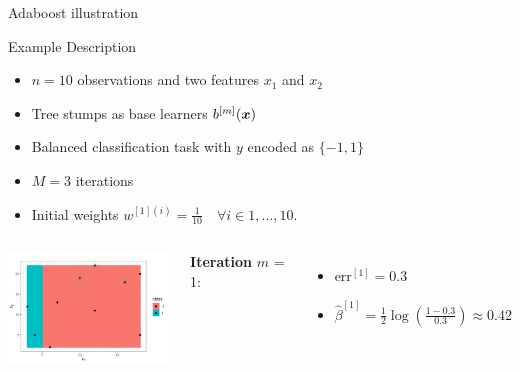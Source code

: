 \begin{vbframe}{Adaboost illustration}
\begin{footnotesize}
Example Description
\begin{itemize}
\item $n = 10$ observations and two features $x_1$ and $x_2$ 
\item Tree stumps as base learners $b^{[m]}(\bm{x})$
\item Balanced classification task with $y$ encoded as $\{-1,1\}$
\item $M = 3$ iterations
\item Initial weights $w^{[1](i)} = \frac{1}{10} \quad \forall i \in 1,\dots ,10$. 
\end{itemize}


\begin{columns}
\column{5cm}

\includegraphics[width=4.7cm]{figure_man/adaboost_viz_mlr_1.png}

\textbf{Iteration} $m$ = 1:
\begin{itemize}
  \item $\text{err}^{[1]} = 0.3$
\item $\hat{\beta}^{[1]} = \frac{1}{2} \log \left( \frac{1 - 0.3}{0.3}\right) \approx 0.42$
\end{itemize}


\column{7cm}


 {

}
\end{columns}
\end{footnotesize}
\end{vbframe}
